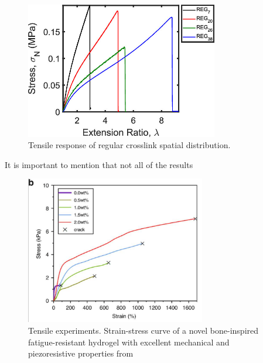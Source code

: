 \begin{figure}[ht!]
    \centering
    \includegraphics[width=0.75\textwidth]{figs/explainMechResponse/singleREGtensile.jpeg}
    \caption{Tensile response of regular crosslink spatial distribution\citep{kongEffectCrossLinkHomogeneity2024}.}
\end{figure}

It is important to mention that not all of the results 

\begin{figure}[ht!]
    \centering
    \includegraphics[width=0.7\textwidth]{figs/mechResponse/mech_response1.png}
    \caption{Tensile experiments. Strain-stress curve  of a novel bone-inspired fatigue-resistant hydrogel with excellent mechanical and piezoresistive properties from\citep{lyuBoneinspiredGNECHAPAAm2023}}
\end{figure}


